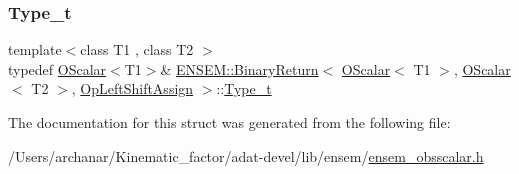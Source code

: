 \mbox{\label{structENSEM_1_1BinaryReturn_3_01OScalar_3_01T1_01_4_00_01OScalar_3_01T2_01_4_00_01OpLeftShiftAssign_01_4_aefc8eaf3b370f05aba6b11f335988425}} 
\subsubsection{\texorpdfstring{Type\_t}{Type\_t}\hspace{0.1cm}{\footnotesize\ttfamily [3/3]}}
{\footnotesize\ttfamily template$<$class T1 , class T2 $>$ \\
typedef \mbox{\hyperlink{classENSEM_1_1OScalar}{O\+Scalar}}$<$T1$>$\& \mbox{\hyperlink{structENSEM_1_1BinaryReturn}{E\+N\+S\+E\+M\+::\+Binary\+Return}}$<$ \mbox{\hyperlink{classENSEM_1_1OScalar}{O\+Scalar}}$<$ T1 $>$, \mbox{\hyperlink{classENSEM_1_1OScalar}{O\+Scalar}}$<$ T2 $>$, \mbox{\hyperlink{structENSEM_1_1OpLeftShiftAssign}{Op\+Left\+Shift\+Assign}} $>$\+::\mbox{\hyperlink{structENSEM_1_1BinaryReturn_3_01OScalar_3_01T1_01_4_00_01OScalar_3_01T2_01_4_00_01OpLeftShiftAssign_01_4_aefc8eaf3b370f05aba6b11f335988425}{Type\+\_\+t}}}



The documentation for this struct was generated from the following file\+:\begin{DoxyCompactItemize}
\item 
/\+Users/archanar/\+Kinematic\+\_\+factor/adat-\/devel/lib/ensem/\mbox{\hyperlink{adat-devel_2lib_2ensem_2ensem__obsscalar_8h}{ensem\+\_\+obsscalar.\+h}}\end{DoxyCompactItemize}
